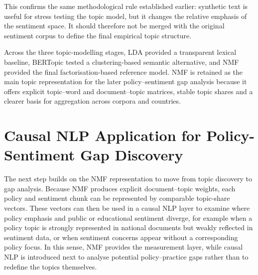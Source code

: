 \documentclass{article}
\begin{document}
This confirms the same methodological rule established earlier: synthetic text is
useful for stress testing the topic model, but it changes the relative emphasis of
the sentiment space. It should therefore not be merged with the original sentiment
corpus to define the final empirical topic structure.


Across the three topic-modelling stages, LDA provided a transparent lexical baseline,
BERTopic tested a clustering-based semantic alternative, and NMF provided the final
factorisation-based reference model. NMF is retained as the main topic representation
for the later policy--sentiment gap analysis because it offers explicit topic--word
and document--topic matrices, stable topic shares and a clearer basis for aggregation
across corpora and countries.

\section{Causal NLP Application for Policy-Sentiment Gap Discovery}

The next step builds on the NMF representation to move from topic discovery to gap
analysis. Because NMF produces explicit document--topic weights, each policy and
sentiment chunk can be represented by comparable topic-share vectors. These vectors
can then be used in a causal NLP layer to examine where policy emphasis and public or
educational sentiment diverge, for example when a policy topic is strongly
represented in national documents but weakly reflected in sentiment data, or when
sentiment concerns appear without a corresponding policy focus. In this sense, NMF
provides the measurement layer, while causal NLP is introduced next to analyse
potential policy--practice gaps rather than to redefine the topics themselves.




\end{document}
